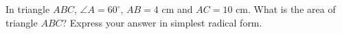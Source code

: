 In triangle $ABC$, $\angle A=60^\circ$, $AB=4$ cm and $AC=10$ cm. What is the area of triangle $ABC$? Express your answer in simplest radical form.
